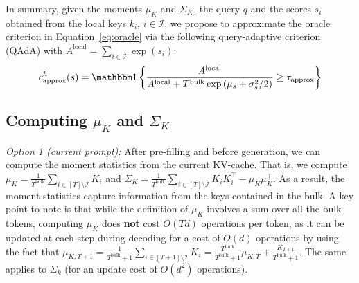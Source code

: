  In summary, given the moments $\mu_K$ and $\Sigma_K$, the query $q$ and  the  scores $s_i$ obtained from the local keys $k_i$, $i \in \mathcal I$, we propose to approximate  the oracle criterion in Equation~\eqref{eq:oracle} via the following query-adaptive criterion (QAdA) with $A^{\text{local}} = \sum_{i\in \mathcal I} \exp(s_i)$:
\begin{align}
 c^h_{\text{approx}}(s)=
        \indicator{ \frac{A^{\text{local}}}{ A^{\text{local}} +\tbulk \exp\left(\mu_s +  \sigma_s^2/2 \right) } 
        \geq \thrsapprox}
        \label{eq:adaptive_criterion}
\end{align}





\subsection{Computing $\mu_K$ and $\Sigma_K$}
\label{sec:moments}
 
\underline{\textit{Option 1 (current prompt):}} After pre-filling and before generation, we can compute the moment statistics from the current KV-cache. That is, we compute $\mu_K = \frac{1}{T^{\text{bulk}}}\sum_{i \in [T] \setminus \mathcal I} K_i $ and $\Sigma_K =\frac{1}{T^{\text{bulk}}}\sum_{ i \in [T] \setminus \mathcal I} K_i K_i^\top - \mu_K \mu_K^\top $. As a result, the moment statistics capture information from the keys contained in the bulk. 
A key point to note is that while the definition of $\mu_K$ involves a sum over all the bulk tokens, computing $\mu_{K}$ does \textbf{not} cost $O(Td)$ operations per token, as it can be updated at each step during decoding for a cost of $O(d)$ operations by using the fact that $\mu_{K, T+1} =  \frac{1}{T^{\text{bulk}} + 1}\sum_{i \in [T+1] \setminus \mathcal I} K_i = 
\frac{T^{\text{bulk}}}{T^{\text{bulk}} + 1}\mu_{K, T} + \frac{K_{T+1}}{T^{\text{bulk}} + 1}$.
The same applies to $\Sigma_k$ (for an update cost of  $O(d^2)$ operations).

